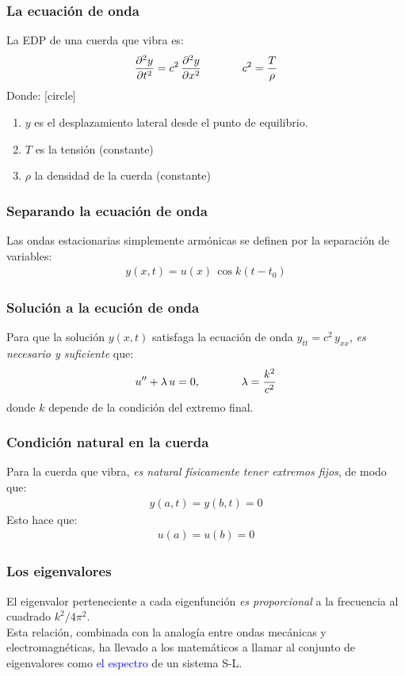 \documentclass[12pt]{beamer}
\begin{document}
\begin{frame}
\frametitle{La ecuación de onda}
La EDP de una cuerda que vibra es:
\pause
\begin{align*}
\pdv[2]{y}{t} = c^{2} \, \pdv[2]{y}{x} \hspace{1.3cm} c^{2} = \dfrac{T}{\rho}
\end{align*}
\pause
Donde:
[circle]
\begin{enumerate}[<+->]
\item $y$ es el desplazamiento lateral desde el punto de equilibrio.
\item $T$ es la tensión (constante)
\item $\rho$ la densidad de la cuerda (constante)
\end{enumerate}
\end{frame}
\begin{frame}
\frametitle{Separando la ecuación de onda}
Las ondas estacionarias simplemente armónicas se definen por la separación de variables:
\begin{align*}
y (x, t) = u (x) \, \cos k(t - t_{0})
\end{align*}
\end{frame}
\begin{frame}
\frametitle{Solución a la ecución de onda}
Para que la solución $y (x, t)$ satisfaga la ecuación de onda $y_{tt} = c^{2} \, y_{xx}$, \pause \emph{es necesario y suficiente} que:
\begin{align*}
{u}^{\prime \prime} + \lambda \, u = 0, \hspace{1.3cm} \lambda = \dfrac{k^{2}}{c^{2}}
\end{align*}
donde $k$ depende de la condición del extremo final.
\end{frame}
\begin{frame}
\frametitle{Condición natural en la cuerda}
Para la cuerda que vibra, \pause \emph{es natural físicamente tener extremos fijos}, de modo que:
\pause
\begin{align*}
y (a, t) = y (b, t) = 0
\end{align*}
\pause
Esto hace que:
\begin{align*}
u (a) = u (b) = 0
\end{align*}
\end{frame}
\begin{frame}
\frametitle{Los eigenvalores}
El eigenvalor perteneciente a cada eigenfunción \emph{es proporcional} a la frecuencia al cuadrado $k^{2}/4 \pi^{2}$.
\\
\bigskip
\pause
Esta relación, combinada con la analogía entre ondas mecánicas y electromagnéticas, ha llevado a los matemáticos a llamar al conjunto de eigenvalores como \textcolor{blue}{el espectro} de un sistema S-L.
\end{frame}
\end{document}
